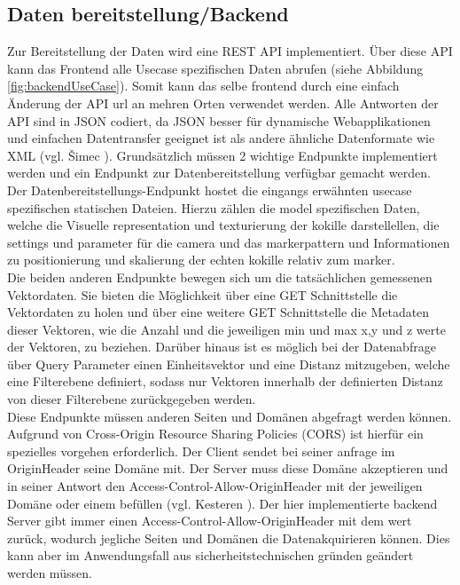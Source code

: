 \subsection{Daten bereitstellung/Backend}
\label{section:Backend}

Zur Bereitstellung der Daten wird eine REST API implementiert. Über diese API kann das 
Frontend alle Usecase spezifischen Daten abrufen (siehe Abbildung \ref{fig:backendUseCase}). Somit kann das selbe frontend durch eine einfach Änderung der API url an mehren Orten verwendet werden. Alle Antworten der API sind in JSON codiert, da JSON besser für dynamische Webapplikationen und einfachen Datentransfer geeignet ist als andere ähnliche Datenformate wie XML (vgl. Šimec \cite{comparisonJsonXml}).
Grundsätzlich müssen 2 wichtige Endpunkte implementiert werden und ein Endpunkt zur Datenbereitstellung verfügbar gemacht werden.\\
Der Datenbereitstellungs-Endpunkt hostet die eingangs erwähnten usecase spezifischen statischen Dateien. Hierzu zählen die model spezifischen Daten, welche die Visuelle representation und texturierung der kokille darstellellen, die settings und parameter für die camera und das markerpattern und Informationen zu positionierung und skalierung der echten kokille relativ zum marker.\\
Die beiden anderen Endpunkte bewegen sich um die tatsächlichen gemessenen Vektordaten. Sie bieten die Möglichkeit über eine GET Schnittstelle die Vektordaten zu holen und über eine weitere GET Schnittstelle die Metadaten dieser Vektoren, wie die Anzahl und die jeweiligen min und max x,y und z werte der Vektoren, zu beziehen. Darüber hinaus ist es möglich bei der Datenabfrage über Query Parameter einen Einheitsvektor und eine Distanz mitzugeben, welche eine Filterebene definiert, sodass nur Vektoren innerhalb der definierten Distanz von dieser Filterebene zurückgegeben werden.\\
Diese Endpunkte müssen anderen Seiten und Domänen abgefragt werden können. Aufgrund von Cross-Origin Resource Sharing Policies (CORS) ist hierfür ein spezielles vorgehen erforderlich. Der Client sendet bei seiner anfrage im \grqq Origin\grqq\space Header seine Domäne mit. Der Server muss diese Domäne akzeptieren und in seiner Antwort den \grqq Access-Control-Allow-Origin\grqq\space Header mit der jeweiligen Domäne oder einem \grqq *\grqq\space befüllen (vgl. Kesteren \cite{van2014cross}). Der hier implementierte backend Server gibt immer einen \grqq Access-Control-Allow-Origin\grqq\space Header mit dem wert \grqq *\grqq\space zurück, wodurch jegliche Seiten und Domänen die Datenakquirieren können. Dies kann aber im Anwendungsfall aus sicherheitstechnischen gründen geändert werden müssen.

